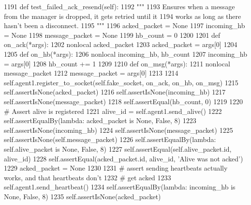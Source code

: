 \begin{DoxyCode}
1191     \textcolor{keyword}{def }test\_failed\_ack\_resend(self):
1192         \textcolor{stringliteral}{"""}
1193 \textcolor{stringliteral}{        Ensures when a message from the manager is dropped, it gets retried until it}
1194 \textcolor{stringliteral}{        works as long as there hasn't been a disconnect.}
1195 \textcolor{stringliteral}{        """}
1196         acked\_packet = \textcolor{keywordtype}{None}
1197         incoming\_hb = \textcolor{keywordtype}{None}
1198         message\_packet = \textcolor{keywordtype}{None}
1199         hb\_count = 0
1200 
1201         \textcolor{keyword}{def }on\_ack(*args):
1202             nonlocal acked\_packet
1203             acked\_packet = args[0]
1204 
1205         \textcolor{keyword}{def }on\_hb(*args):
1206             nonlocal incoming\_hb, hb\_count
1207             incoming\_hb = args[0]
1208             hb\_count += 1
1209 
1210         \textcolor{keyword}{def }on\_msg(*args):
1211             nonlocal message\_packet
1212             message\_packet = args[0]
1213 
1214         self.agent1.register\_to\_socket(self.fake\_socket, on\_ack, on\_hb, on\_msg)
1215         self.assertIsNone(acked\_packet)
1216         self.assertIsNone(incoming\_hb)
1217         self.assertIsNone(message\_packet)
1218         self.assertEqual(hb\_count, 0)
1219 
1220         \textcolor{comment}{# Assert alive is registered}
1221         alive\_id = self.agent1.send\_alive()
1222         self.assertEqualBy(\textcolor{keyword}{lambda}: acked\_packet \textcolor{keywordflow}{is} \textcolor{keywordtype}{None}, \textcolor{keyword}{False}, 8)
1223         self.assertIsNone(incoming\_hb)
1224         self.assertIsNone(message\_packet)
1225         self.assertIsNone(self.message\_packet)
1226         self.assertEqualBy(\textcolor{keyword}{lambda}: self.alive\_packet \textcolor{keywordflow}{is} \textcolor{keywordtype}{None}, \textcolor{keyword}{False}, 8)
1227         self.assertEqual(self.alive\_packet.id, alive\_id)
1228         self.assertEqual(acked\_packet.id, alive\_id, \textcolor{stringliteral}{'Alive was not acked'})
1229         acked\_packet = \textcolor{keywordtype}{None}
1230 
1231         \textcolor{comment}{# assert sending heartbeats actually works, and that heartbeats don't}
1232         \textcolor{comment}{# get acked}
1233         self.agent1.send\_heartbeat()
1234         self.assertEqualBy(\textcolor{keyword}{lambda}: incoming\_hb \textcolor{keywordflow}{is} \textcolor{keywordtype}{None}, \textcolor{keyword}{False}, 8)
1235         self.assertIsNone(acked\_packet)

\end{DoxyCode}

